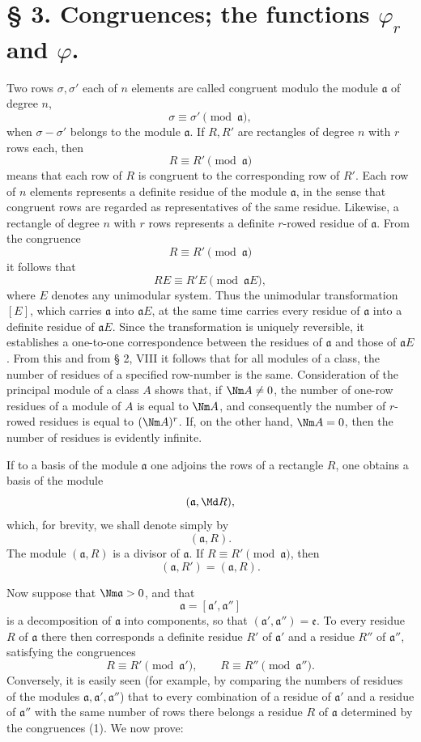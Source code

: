 \section*{§ 3. Congruences; the functions $\varphi_r$ and $\varphi$.}

Two rows $\sigma,\sigma'$ each of $n$ elements are called congruent modulo the module $\mathfrak a$ of degree $n$,
\[
 \sigma\equiv\sigma'\pmod{\mathfrak a},
\]
when $\sigma-\sigma'$ belongs to the module $\mathfrak a$. If $R,R'$ are rectangles of degree $n$ with $r$ rows each, then
\[
 R\equiv R'\pmod{\mathfrak a}
\]
means that each row of $R$ is congruent to the corresponding row of $R'$. Each row of $n$ elements represents a definite residue of the module $\mathfrak a$, in the sense that congruent rows are regarded as representatives of the same residue. Likewise, a rectangle of degree $n$ with $r$ rows represents a definite $r$-rowed residue of $\mathfrak a$. From the congruence
\[
 R\equiv R'\pmod{\mathfrak a}
\]
it follows that
\[
 RE\equiv R'E\pmod{\mathfrak aE},
\]
where $E$ denotes any unimodular system. Thus the unimodular transformation $[E]$, which carries $\mathfrak a$ into $\mathfrak aE$, at the same time carries every residue of $\mathfrak a$ into a definite residue of $\mathfrak aE$. Since the transformation is uniquely reversible, it establishes a one-to-one correspondence between the residues of $\mathfrak a$ and those of $\mathfrak aE$. From this and from § 2, VIII it follows that for all modules of a class, the number of residues of a specified row-number is the same. Consideration of the principal module of a class $A$ shows that, if $\Nm A\ne0$, the number of one-row residues of a module of $A$ is equal to $\Nm A$, and consequently the number of $r$-rowed residues is equal to $(\Nm A)^r$. If, on the other hand, $\Nm A=0$, then the number of residues is evidently infinite.

If to a basis of the module $\mathfrak a$ one adjoins the rows of a rectangle $R$, one obtains a basis of the module
\[
 (\mathfrak a,\Md R),
\]
which, for brevity, we shall denote simply by
\[
 (\mathfrak a,R).
\]
The module $(\mathfrak a,R)$ is a divisor of $\mathfrak a$. If $R\equiv R'\pmod{\mathfrak a}$, then
\[
 (\mathfrak a,R')=(\mathfrak a,R).
\]

Now suppose that $\Nm\mathfrak a>0$, and that
\[
 \mathfrak a=[\mathfrak a',\mathfrak a'']
\]
is a decomposition of $\mathfrak a$ into components, so that $(\mathfrak a',\mathfrak a'')=\mathfrak e$. To every residue $R$ of $\mathfrak a$ there then corresponds a definite residue $R'$ of $\mathfrak a'$ and a residue $R''$ of $\mathfrak a''$, satisfying the congruences
\begin{equation}
 R\equiv R'\pmod{\mathfrak a'},
 \qquad
 R\equiv R''\pmod{\mathfrak a''}.
\tag{1}
\end{equation}
Conversely, it is easily seen (for example, by comparing the numbers of residues of the modules $\mathfrak a,\mathfrak a',\mathfrak a''$) that to every combination of a residue of $\mathfrak a'$ and a residue of $\mathfrak a''$ with the same number of rows there belongs a residue $R$ of $\mathfrak a$ determined by the congruences (1). We now prove:

